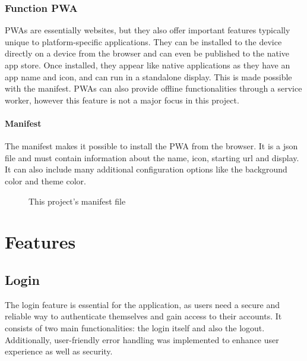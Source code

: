 \documentclass[a4paper,12pt]{report}
\begin{document}
\subsection{Function PWA}
PWAs are essentially websites, but they also offer important features typically unique to platform-specific applications. They can be installed to the device directly on a device from the browser and can even be published to the native app store. Once installed, they appear like native applications as they have an app name and icon, and can run in a standalone display. This is made possible with the manifest. PWAs can also provide offline functionalities through a service worker, however this feature is not a major focus in this project. \parencite{mdn-pwa}
\subsubsection{Manifest}
The manifest makes it possible to install the PWA from the browser. It is a json file and must contain information about the name, icon, starting url and display. It can also include many additional configuration options like the background color and theme color. \parencite{mdn-pwa-installation}
\begin{figure}[H]
	\caption{This project's manifest file}
	\label{fig:example-maifest}
\end{figure} 

\chapter{Features}
\section{Login}
The login feature is essential for the application, as users need a secure and reliable way to authenticate themselves and gain access to their accounts. It consists of two main functionalities: the login itself and also the logout. Additionally, user-friendly error handling was implemented to enhance user experience as well as security. \\
\end{document}
